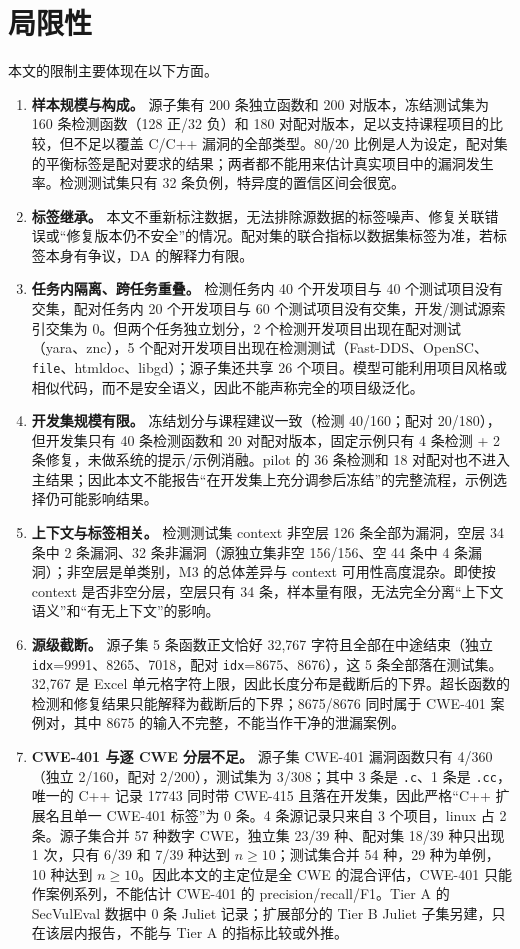 \documentclass[conference]{IEEEtran}
\begin{document}
\section{局限性}
\label{sec:limitations}
本文的限制主要体现在以下方面。
\begin{enumerate}
    \item \textbf{样本规模与构成。} 源子集有 200 条独立函数和 200 对版本，冻结测试集为 160 条检测函数（128 正/32 负）和 180 对配对版本，足以支持课程项目的比较，但不足以覆盖 C/C++ 漏洞的全部类型。80/20 比例是人为设定，配对集的平衡标签是配对要求的结果；两者都不能用来估计真实项目中的漏洞发生率。检测测试集只有 32 条负例，特异度的置信区间会很宽。
    \item \textbf{标签继承。} 本文不重新标注数据，无法排除源数据的标签噪声、修复关联错误或“修复版本仍不安全”的情况。配对集的联合指标以数据集标签为准，若标签本身有争议，DA 的解释力有限。
    \item \textbf{任务内隔离、跨任务重叠。} 检测任务内 40 个开发项目与 40 个测试项目没有交集，配对任务内 20 个开发项目与 60 个测试项目没有交集，开发/测试源索引交集为 0。但两个任务独立划分，2 个检测开发项目出现在配对测试（yara、znc），5 个配对开发项目出现在检测测试（Fast-DDS、OpenSC、\texttt{file}、htmldoc、libgd）；源子集还共享 26 个项目。模型可能利用项目风格或相似代码，而不是安全语义，因此不能声称完全的项目级泛化。
    \item \textbf{开发集规模有限。} 冻结划分与课程建议一致（检测 40/160；配对 20/180），但开发集只有 40 条检测函数和 20 对配对版本，固定示例只有 4 条检测 + 2 条修复，未做系统的提示/示例消融。pilot 的 36 条检测和 18 对配对也不进入主结果；因此本文不能报告“在开发集上充分调参后冻结”的完整流程，示例选择仍可能影响结果。
    \item \textbf{上下文与标签相关。} 检测测试集 context 非空层 126 条全部为漏洞，空层 34 条中 2 条漏洞、32 条非漏洞（源独立集非空 156/156、空 44 条中 4 条漏洞）；非空层是单类别，M3 的总体差异与 context 可用性高度混杂。即使按 context 是否非空分层，空层只有 34 条，样本量有限，无法完全分离“上下文语义”和“有无上下文”的影响。
    \item \textbf{源级截断。} 源子集 5 条函数正文恰好 32{,}767 字符且全部在中途结束（独立 \texttt{idx}=9991、8265、7018，配对 \texttt{idx}=8675、8676），这 5 条全部落在测试集。32{,}767 是 Excel 单元格字符上限，因此长度分布是截断后的下界。超长函数的检测和修复结果只能解释为截断后的下界；8675/8676 同时属于 CWE-401 案例对，其中 8675 的输入不完整，不能当作干净的泄漏案例。
    \item \textbf{CWE-401 与逐 CWE 分层不足。} 源子集 CWE-401 漏洞函数只有 4/360（独立 2/160，配对 2/200），测试集为 3/308；其中 3 条是 \texttt{.c}、1 条是 \texttt{.cc}，唯一的 C++ 记录 17743 同时带 CWE-415 且落在开发集，因此严格“C++ 扩展名且单一 CWE-401 标签”为 0 条。4 条源记录只来自 3 个项目，linux 占 2 条。源子集合并 57 种数字 CWE，独立集 23/39 种、配对集 18/39 种只出现 1 次，只有 6/39 和 7/39 种达到 $n\ge 10$；测试集合并 54 种，29 种为单例，10 种达到 $n\ge 10$。因此本文的主定位是全 CWE 的混合评估，CWE-401 只能作案例系列，不能估计 CWE-401 的 precision/recall/F1。Tier A 的 SecVulEval 数据中 0 条 Juliet 记录；扩展部分的 Tier B Juliet 子集另建，只在该层内报告，不能与 Tier A 的指标比较或外推。

\end{enumerate}
\end{document}

